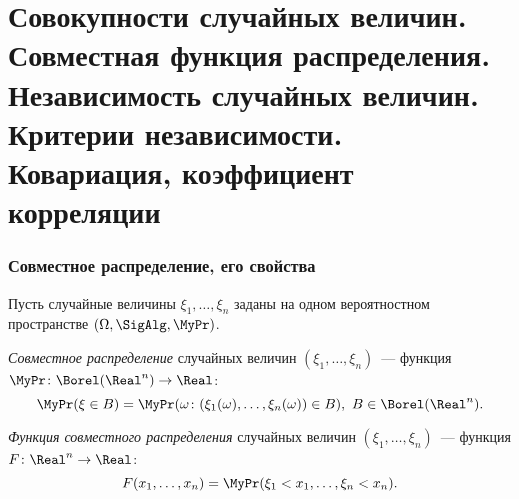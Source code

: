 \section{Совокупности случайных величин. Совместная функция распределения. Независимость случайных величин. Критерии независимости. Ковариация, коэффициент корреляции}

\subsubsection{Совместное распределение, его свойства}

Пусть случайные величины $\xi_1, \ldots, \xi_n$ заданы на одном вероятностном пространстве $(\Omega, \SigAlg, \MyPr)$.
\begin{defn}
    \textit{Совместное распределение} случайных величин $(\xi_1, \ldots, \xi_n)$~--- функция $\MyPr\colon \Borel(\Real^{n}) \to \Real$:
    \begin{equation*}
        \MyPr(\xi \in B) = \MyPr(\omega \colon (\xi_{1}(\omega), \ldots, \xi_{n}(\omega)) \in B),~ B \in \Borel(\Real^{n}).
    \end{equation*}
\end{defn}
\begin{defn}
    \textit{Функция совместного распределения} случайных величин $(\xi_1, \ldots, \xi_n)$~--- функция $F\colon \Real^{n} \to \Real$:
    \begin{equation*}
        F(x_{1}, \ldots, x_{n})=\MyPr(\xi_{1}<x_{1}, \ldots, \xi_{n}<x_{n}).
    \end{equation*}
\end{defn}

